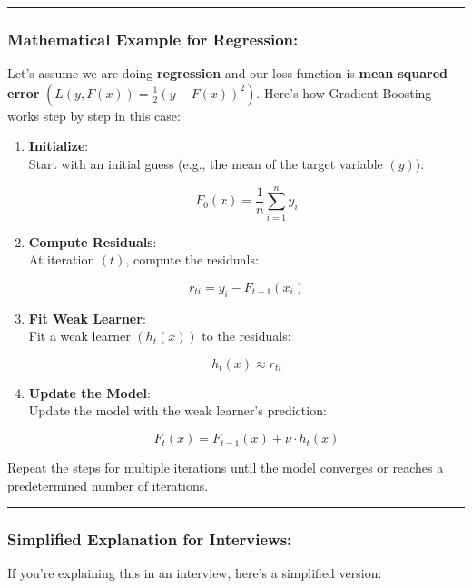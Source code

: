 \documentclass[12pt]{book}
\begin{document}
\begin{center}\rule{0.5\linewidth}{0.5pt}\end{center}

\subsubsection{Mathematical Example for
Regression:}\label{mathematical-example-for-regression}

Let's assume we are doing \textbf{regression} and our loss function is
\textbf{mean squared error}
\(( L(y, F(x)) = \frac{1}{2}(y - F(x))^2 )\). Here's how Gradient
Boosting works step by step in this case:

\begin{enumerate}
\def\labelenumi{\arabic{enumi}.}
\item
  \textbf{Initialize}:\\
  Start with an initial guess (e.g., the mean of the target variable
  \(( y )\)):

  \[
  F_0(x) = \frac{1}{n} \sum_{i=1}^{n} y_i
  \]
\item
  \textbf{Compute Residuals}:\\
  At iteration \(( t )\), compute the residuals:

  \[
  r_{ti} = y_i - F_{t-1}(x_i)
  \]
\item
  \textbf{Fit Weak Learner}:\\
  Fit a weak learner \(( h_t(x) )\) to the residuals:

  \[
  h_t(x) \approx r_{ti}
  \]
\item
  \textbf{Update the Model}:\\
  Update the model with the weak learner's prediction:

  \[
  F_t(x) = F_{t-1}(x) + \nu \cdot h_t(x)
  \]
\end{enumerate}

Repeat the steps for multiple iterations until the model converges or
reaches a predetermined number of iterations.

\begin{center}\rule{0.5\linewidth}{0.5pt}\end{center}

\subsubsection{Simplified Explanation for
Interviews:}\label{simplified-explanation-for-interviews-1}

If you're explaining this in an interview, here's a simplified version:
\end{document}
